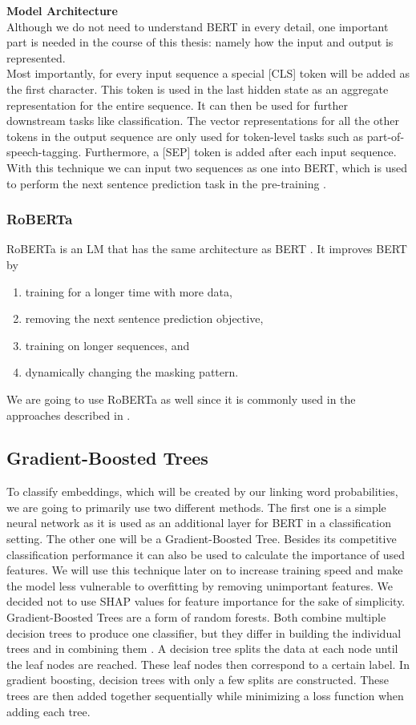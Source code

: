 \newpage

\textbf{Model Architecture} \\
Although we do not need to understand BERT in every detail, one important part is needed in the course of this thesis: namely how the input and output is represented. \\
Most importantly, for every input sequence a special [CLS] token will be added as the first character. This token is used in the last hidden state as an aggregate representation for the entire sequence. It can then be used for further downstream tasks like classification. The vector representations for all the other tokens in the output sequence are only used for token-level tasks such as part-of-speech-tagging. Furthermore, a [SEP] token is added after each input sequence. With this technique we can input two sequences as one into BERT, which is used to perform the next sentence prediction task in the pre-training \cite{bert}.


\subsubsection{RoBERTa}
RoBERTa is an LM that has the same architecture as BERT \cite{roberta}. It improves BERT by
\begin{enumerate}
	\item training for a longer time with more data,
	\item removing the next sentence prediction objective,
	\item training on longer sequences, and
	\item dynamically changing the masking pattern.
\end{enumerate}
We are going to use RoBERTa as well since it is commonly used in the approaches described in \cite{argsvalidnovel2022}.

\subsection{Gradient-Boosted Trees}
To classify embeddings, which will be created by our linking word probabilities, we are going to primarily use two different methods. The first one is a simple neural network as it is used as an additional layer for BERT in a classification setting. The other one will be a Gradient-Boosted Tree. Besides its competitive classification performance it can also be used to calculate the importance of used features. We will use this technique later on to increase training speed and make the model less vulnerable to overfitting by removing unimportant features. We decided not to use SHAP values \cite{shap} for feature importance for the sake of simplicity. \\
Gradient-Boosted Trees are a form of random forests. Both combine multiple decision trees to produce one classifier, but they differ in building the individual trees and in combining them \cite{gradboost}. A decision tree splits the data at each node until the leaf nodes are reached. These leaf nodes then correspond to a certain label. In gradient boosting, decision trees with only a few splits are constructed. These trees are then added together sequentially while minimizing a loss function when adding each tree.

